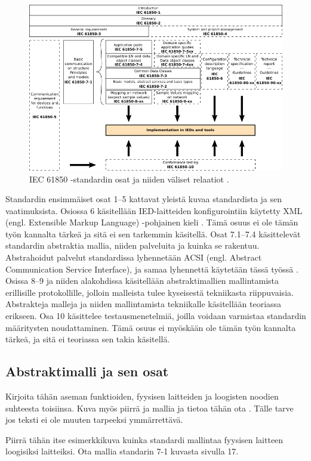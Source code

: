 \begin{figure}
	\includegraphics[width=1\textwidth]{pictures/iec61850-series-parts-and-relations.png}
	\caption{IEC 61850 -standardin osat ja niiden väliset relaatiot \cite[s.~14]{IEC61850-7-1} \cite[s.~22]{IEC61850-1}.}
	\label{fig:iec61850-osat-ja-relaatiot}
\end{figure}

Standardin ensimmäiset osat 1--5 kattavat yleistä kuvaa standardista ja sen vaatimuksista. Osiossa 6 käsitellään IED-laitteiden konfigurointiin käytetty XML (engl. Extensible Markup Language) -pohjainen kieli \cite[s.~7--8]{IEC61850-6}. Tämä osuus ei ole tämän työn kannalta tärkeä ja sitä ei sen tarkemmin käsitellä. Osat 7.1--7.4 käsittelevät standardin abstraktia mallia, niiden palveluita ja kuinka se rakentuu. Abstrahoidut palvelut standardissa lyhennetään ACSI (engl. Abstract Communication Service Interface), ja samaa lyhennettä käytetään tässä työssä \cite[s.~72]{IEC61850-7-1}. Osissa 8--9 ja niiden alakohdissa käsitellään abstraktimallien mallintamista erillisille protokollille, jolloin malleista tulee kyseisestä tekniikasta riippuvaisia. Abstrakteja malleja ja niiden mallintamista tekniikalle käsitellään teoriassa erikseen. Osa 10 käsittelee testausmenetelmiä, joilla voidaan varmistaa standardin määritysten noudattaminen. Tämä osuus ei myöskään ole tämän työn kannalta tärkeä, ja sitä ei teoriassa sen takia käsitellä. \cite[s.~15]{IEC61850-7-1}


\subsection{Abstraktimalli ja sen osat}
\begin{it}
	Kirjoita tähän aseman funktioiden, fyysisen laitteiden ja loogisten noodien suhteesta toisiinsa. Kuva myös piirrä ja mallia ja tietoa tähän ota \cite[s.~19]{IEC61850-1}. Tälle tarve jos teksti ei ole muuten tarpeeksi ymmärrettävä.

	Piirrä tähän itse esimerkkikuva kuinka standardi mallintaa fyysisen laitteen loogisiksi laitteiksi. Ota mallia standarin 7-1 kuvasta sivulla 17.
\end{it}

